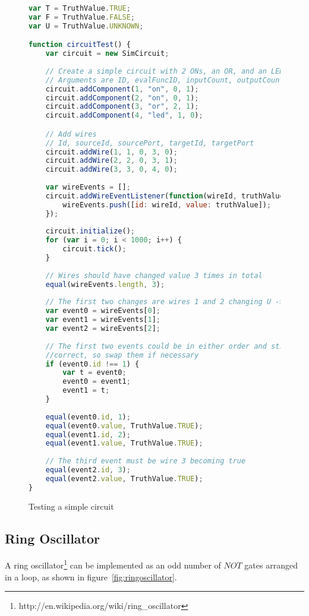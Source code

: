 \begin{figure}
\begin{lstlisting}[language=JavaScript]
var T = TruthValue.TRUE;
var F = TruthValue.FALSE;
var U = TruthValue.UNKNOWN;

function circuitTest() {
	var circuit = new SimCircuit;
	
	// Create a simple circuit with 2 ONs, an OR, and an LED
	// Arguments are ID, evalFuncID, inputCount, outputCount
	circuit.addComponent(1, "on", 0, 1);
	circuit.addComponent(2, "on", 0, 1);
	circuit.addComponent(3, "or", 2, 1);
	circuit.addComponent(4, "led", 1, 0);

	// Add wires
	// Id, sourceId, sourcePort, targetId, targetPort
	circuit.addWire(1, 1, 0, 3, 0);
	circuit.addWire(2, 2, 0, 3, 1);
	circuit.addWire(3, 3, 0, 4, 0);
	
	var wireEvents = [];
	circuit.addWireEventListener(function(wireId, truthValue) {
		wireEvents.push([id: wireId, value: truthValue]);
	});
	
	circuit.initialize();
	for (var i = 0; i < 1000; i++) {
		circuit.tick();
	}
	
	// Wires should have changed value 3 times in total
	equal(wireEvents.length, 3);
	
	// The first two changes are wires 1 and 2 changing U -> T
	var event0 = wireEvents[0];
	var event1 = wireEvents[1];
	var event2 = wireEvents[2];
	
	// The first two events could be in either order and still be 
	//correct, so swap them if necessary
	if (event0.id !== 1) {
		var t = event0;
		event0 = event1;
		event1 = t;
	}
	
	equal(event0.id, 1);
	equal(event0.value, TruthValue.TRUE);
	equal(event1.id, 2);
	equal(event1.value, TruthValue.TRUE);
	
	// The third event must be wire 3 becoming true
	equal(event2.id, 3);
	equal(event2.value, TruthValue.TRUE);
}
\end{lstlisting}
\caption{Testing a simple circuit}
\label{fig:circuittest}
\end{figure}

\subsection{Ring Oscillator}
A ring oscillator\footnote{http://en.wikipedia.org/wiki/ring\_oscillator} can be implemented as an odd number of $NOT$ gates arranged in a loop, as shown in figure~\ref{fig:ringoscillator}. 

